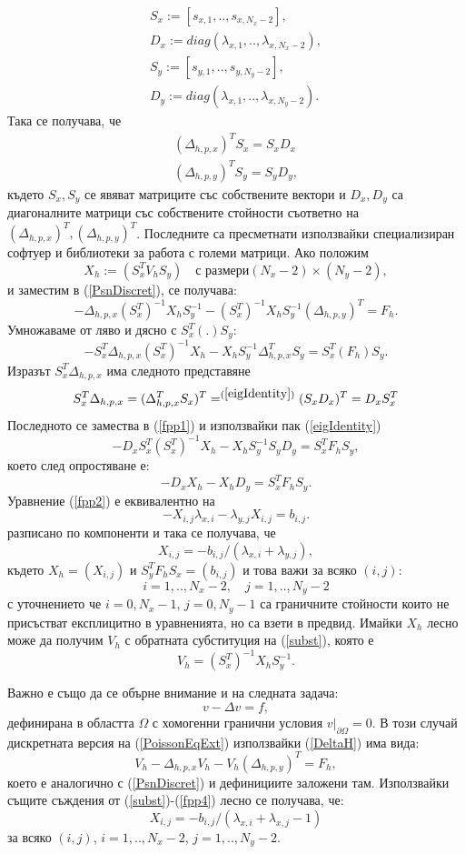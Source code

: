 \documentclass[a4paper]{article}
\newcommand{\be}{\begin{equation}}
\newcommand{\ee}{\end{equation}}
\newcommand{\rf}[1]{(\ref{#1})}
\theoremstyle{remark}
\begin{document}
\begin{align}
S_x:=[s_{x,1},..,s_{x,N_x-2}],\\
D_x:= diag(\lambda_{x,1},..,\lambda_{x,N_x-2}),\\
S_y:=[s_{y,1},..,s_{y,N_y-2}],\\
D_y:= diag(\lambda_{x,1},..,\lambda_{x,N_y-2}).
\end{align}
Така се получава, че
\begin{align}\label{eigIdentity}
(\Delta_{h,p,x})^T  S_x = S_x  D_x\nonumber\\
(\Delta_{h,p,y})^T   S_y = S_y  D_y,
\end{align}
където $S_x, S_y$ се явяват матриците със собствените вектори и $D_x, D_y$ са диагоналните матрици със собствените стойности съответно на $(\Delta_{h,p,x})^T, (\Delta_{h,p,y})^T$. Последните са пресметнати използвайки специализиран софтуер и библиотеки за работа с големи матрици. Ако положим
\be\label{subst}
X_h := ( S_x^T  V_h  S_y ) \quad \text{с размери} (N_x-2)\times(N_y-2),
\ee
и заместим в \rf{PsnDiscret}, се получава:
\be
-\Delta_{h,p,x}  (S_x^T)^{-1} X_h  S_y^{-1}  -(S_x^T)^{-1} X_h  S_y^{-1}  (\Delta_{h,p,y})^T = F_h.
\ee
Умножаваме от ляво и дясно с $ S_x^T  ( . )  S_y$:
\be\label{fpp1}
- S_x^T \Delta_{h,p,x} (S_x^T)^{-1} X_h -X_h  S_y^{-1}  \Delta_{h,p,x}^T  S_y = S_x^T  ( F_h )  S_y.
\ee
Изразът $S_x^T  \Delta_{h,p,x}$ има следното представяне
\be
S_x^T  \Delta_{h,p,x} = (\Delta_{h,p,x}^T  S_x)^T =^{\rf{eigIdentity}} (S_x  D_x)^T = D_x  S_x^T
\ee
Последното се замества в \rf{fpp1} и използвайки пак \rf{eigIdentity}
\be
- D_x  S_x^T (S_x^T)^{-1} X_h  -X_h  S_y^{-1}  S_y  D_y = S_x^T  F_h   S_y,
\ee
което след опростяване е:
\be\label{fpp2}
- D_x  X_h -X_h  D_y = S_x^T  F_h  S_y.
\ee
Уравнение \rf{fpp2} е еквивалентно на
\be\label{fpp3}
-X_{i,j} \lambda_{x,i} - \lambda_{y,j} X_{i,j} = b_{i,j}.
\ee
разписано по компоненти и така се получава, че
\be\label{fpp4}
X_{i,j} = - b_{i,j}/(\lambda_{x,i} + \lambda_{y,j} ),
\ee
където $X_h = (X_{i,j})$ и $S_y^T  F_h   S_x = (b_{i,j})$ и това важи за всяко $(i,j)$:
$$i = 1,..,N_x-2, \quad j = 1,..,N_y-2 $$
с уточнението че $i = 0,N_x-1$, $j = 0,N_y-1$ са граничните стойности които не присъстват експлицитно в уравненията, но са взети в предвид. Имайки $X_h$ лесно може да получим $V_h$  с обратната субституция на \rf{subst}, която е 
\be\label{substInv}
V_h = (S_x^T)^{-1}  X_h  S_y^{-1}.
\ee

Важно е също да се обърне внимание и на следната задача:
\be\label{PoissonEqExt}
v-\Delta v = f,
\ee
дефинирана в областта $\Omega$ с хомогенни гранични условия $v \big|_{\partial\Omega} = 0$. В този случай дискретната версия на \rf{PoissonEqExt} използвайки \rf{DeltaH} има вида:
\be\label{PsnDiscretExt}
V_h - \Delta_{h,p,x}  V_h - V_h  (\Delta_{h,p,y}) ^{T}  = F_h,
\ee
което е аналогично с \rf{PsnDiscret} и дефинициите заложени там. Използвайки същите съждения от \rf{subst}-\rf{fpp4} лесно се получава, че:
\be\label{fpp4Ext}
X_{i,j} = - b_{i,j}/(\lambda_{x,i}  + \lambda_{x,j} -1)
\ee
за всяко $(i,j)$, $i = 1,..,N_x-2$, $j = 1,..,N_y-2 $.
\end{document}
